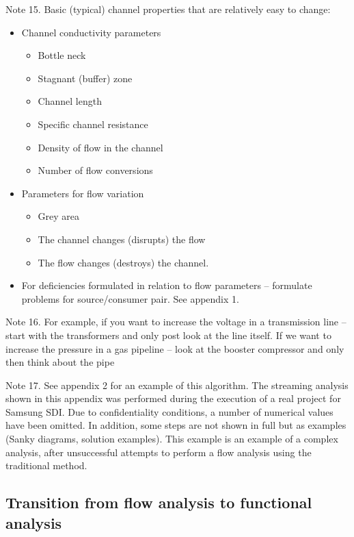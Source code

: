 \documentclass[a4paper,11pt]{article}
\begin{document}
\begin{enumerate}
\begin{itemize}
    Note 15. Basic (typical) channel properties that are relatively easy to
    change:
    \begin{itemize}
    \item Channel conductivity parameters
      \begin{itemize}
      \item Bottle neck
      \item Stagnant (buffer) zone
      \item Channel length
      \item Specific channel resistance
      \item Density of flow in the channel
      \item Number of flow conversions
      \end{itemize}
    \item Parameters for flow variation
      \begin{itemize}
      \item Grey area
      \item The channel changes (disrupts) the flow
      \item The flow changes (destroys) the channel.
      \end{itemize}
    \item For deficiencies formulated in relation to flow parameters --
      formulate problems for source/consumer pair. See appendix 1.
    \end{itemize}
  \end{itemize}
  Note 16. For example, if you want to increase the voltage in a transmission
  line -- start with the transformers and only post look at the line itself.
  If we want to increase the pressure in a gas pipeline -- look at the booster
  compressor and only then think about the pipe

  Note 17. See appendix 2 for an example of this algorithm. The streaming
  analysis shown in this appendix was performed during the execution of a real
  project for Samsung SDI. Due to confidentiality conditions, a number of
  numerical values have been omitted. In addition, some steps are not shown in
  full but as examples (Sanky diagrams, solution examples). This example is an
  example of a complex analysis, after unsuccessful attempts to perform a flow
  analysis using the traditional method.
\end{enumerate}

\subsection{Transition from flow analysis to functional analysis}
\end{document}
